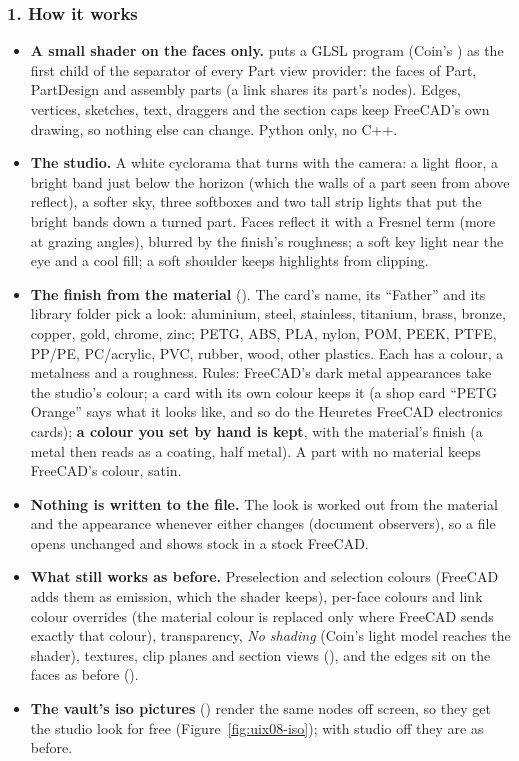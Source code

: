 \subsubsection*{1. How it works}

\begin{itemize}
  \item \textbf{A small shader on the faces only.}  puts a GLSL program (Coin's
        ) as the first child of the  separator of every Part view provider: the
        faces of Part, PartDesign and assembly parts (a link shares its part's nodes). Edges, vertices, sketches,
        text, draggers and the section caps keep FreeCAD's own drawing, so nothing else can change. Python only,
        no C++.
  \item \textbf{The studio.} A white cyclorama that turns with the camera: a light floor, a bright band just below
        the horizon (which the walls of a part seen from above reflect), a softer sky, three softboxes and two tall
        strip lights that put the bright bands down a turned part. Faces reflect it with a Fresnel term (more at
        grazing angles), blurred by the finish's roughness; a soft key light near the eye and a cool fill; a soft
        shoulder keeps highlights from clipping.
  \item \textbf{The finish from the material} (). The card's name, its ``Father'' and its library
        folder pick a look: aluminium, steel, stainless, titanium, brass, bronze, copper, gold, chrome, zinc;
        PETG, ABS, PLA, nylon, POM, PEEK, PTFE, PP/PE, PC/acrylic, PVC, rubber, wood, other plastics. Each has a
        colour, a metalness and a roughness. Rules: FreeCAD's dark metal appearances take the studio's colour; a
        card with its own colour keeps it (a shop card ``PETG Orange'' says what it looks like, and so do the
        Heuretes FreeCAD electronics cards); \textbf{a colour you set by hand is kept}, with the material's finish (a
        metal then reads as a coating, half metal). A part with no material keeps FreeCAD's colour, satin.
  \item \textbf{Nothing is written to the file.} The look is worked out from the material and the appearance
        whenever either changes (document observers), so a file opens unchanged and shows stock in a stock FreeCAD.
  \item \textbf{What still works as before.} Preselection and selection colours (FreeCAD adds them as emission,
        which the shader keeps), per-face colours and link colour overrides (the material colour is replaced only
        where FreeCAD sends exactly that colour), transparency, \emph{No shading} (Coin's light model reaches the
        shader), textures, clip planes and section views (), and the edges sit on the faces as
        before ().
  \item \textbf{The vault's iso pictures} () render the same nodes off screen, so they
        get the studio look for free (Figure~\ref{fig:uix08-iso}); with studio off they are as before.
\end{itemize}


